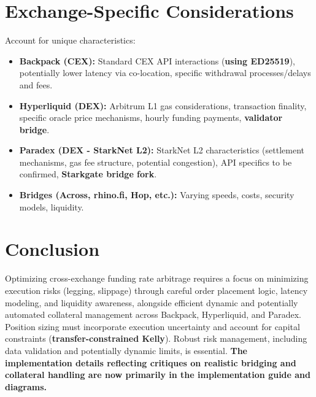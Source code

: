 \documentclass{article}
\begin{document}
\section{Exchange-Specific Considerations}
Account for unique characteristics:
\begin{itemize}
    \item \textbf{Backpack (CEX):} Standard CEX API interactions (\textbf{using ED25519}), potentially lower latency via co-location, specific withdrawal processes/delays and fees.
    \item \textbf{Hyperliquid (DEX):} Arbitrum L1 gas considerations, transaction finality, specific oracle price mechanisms, hourly funding payments, \textbf{validator bridge}.
    \item \textbf{Paradex (DEX - StarkNet L2):} StarkNet L2 characteristics (settlement mechanisms, gas fee structure, potential congestion), API specifics to be confirmed, \textbf{Starkgate bridge fork}.
    \item \textbf{Bridges (Across, rhino.fi, Hop, etc.):} Varying speeds, costs, security models, liquidity.
\end{itemize}

\section{Conclusion}
Optimizing cross-exchange funding rate arbitrage requires a focus on minimizing execution risks (legging, slippage) through careful order placement logic, latency modeling, and liquidity awareness, alongside efficient dynamic and potentially automated collateral management across Backpack, Hyperliquid, and Paradex. Position sizing must incorporate execution uncertainty and account for capital constraints (\textbf{transfer-constrained Kelly}). Robust risk management, including data validation and potentially dynamic limits, is essential. \textbf{The implementation details reflecting critiques on realistic bridging and collateral handling are now primarily in the implementation guide and diagrams.}
\end{document}
